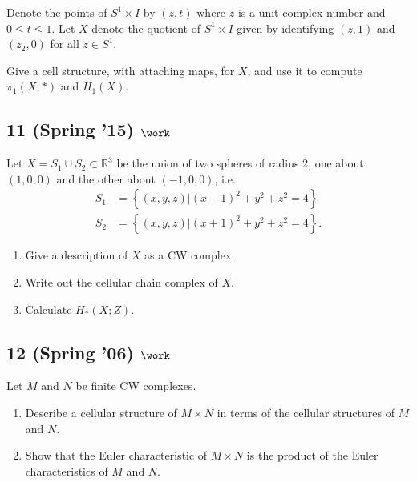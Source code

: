 Denote the points of \(S^1 \times I\) by \((z, t)\) where \(z\) is a
unit complex number and \(0 \leq t \leq 1\). Let \(X\) denote the
quotient of \(S^1 \times I\) given by identifying \((z, 1)\) and
\((z_2 , 0)\) for all \(z \in S^1\).

Give a cell structure, with attaching maps, for \(X\), and use it to
compute \(\pi_1 (X, \ast)\) and \(H_1 (X)\).

\hypertarget{spring-15-work-2}{%
\subsection{\texorpdfstring{11 (Spring '15)
\(\work\)}{11 (Spring '15) \textbackslash work}}\label{spring-15-work-2}}

Let \(X = S_1 \cup S_2 \subset {\mathbb{R}}^3\) be the union of two
spheres of radius 2, one about \((1, 0, 0)\) and the other about
\((-1, 0, 0)\), i.e.~
\begin{align*}  
S_1 &= \left\{{(x, y,z) \mathrel{\Big|}(x-1)^2 + y^2 +z^2 = 4}\right\} \\
S_2 &= \left\{{(x, y, z) \mathrel{\Big|}(x + 1)^2 + y^2 + z^2 = 4}\right\}
.\end{align*}

\begin{enumerate}
\def\labelenumi{\alph{enumi}.}
\item
  Give a description of \(X\) as a CW complex.
\item
  Write out the cellular chain complex of \(X\).
\item
  Calculate \(H_* (X; Z)\).
\end{enumerate}

\hypertarget{spring-06-work-5}{%
\subsection{\texorpdfstring{12 (Spring '06)
\(\work\)}{12 (Spring '06) \textbackslash work}}\label{spring-06-work-5}}

Let \(M\) and \(N\) be finite CW complexes.

\begin{enumerate}
\def\labelenumi{\alph{enumi}.}
\item
  Describe a cellular structure of \(M \times N\) in terms of the
  cellular structures of \(M\) and \(N\).
\item
  Show that the Euler characteristic of \(M \times N\) is the product of
  the Euler characteristics of \(M\) and \(N\).
\end{enumerate}

